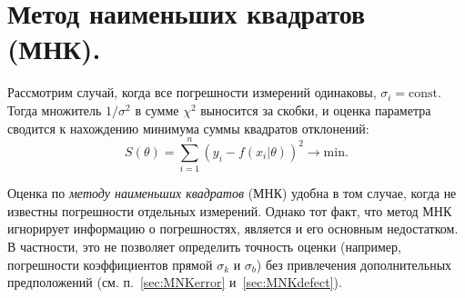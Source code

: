 \section{Метод наименьших квадратов (МНК).}

Рассмотрим случай, когда все погрешности измерений одинаковы,
$\sigma_i=\mathrm{const}$. Тогда множитель $1/\sigma^2$ в сумме $\chi^2$
выносится за скобки, и оценка параметра сводится к нахождению минимума суммы
квадратов отклонений:
\begin{equation}
S(\theta) = \sum_{i=1}^n \left(y_i - f(x_i|\theta)\right)^2 \to \mathrm{min}.
\end{equation}


Оценка по \emph{методу наименьших квадратов} (МНК) удобна в том случае,
когда не известны погрешности отдельных измерений. Однако тот  факт, что
метод МНК игнорирует информацию о погрешностях, является и его основным
недостатком. В частности, это не позволяет определить точность оценки
(например, погрешности коэффициентов прямой $\sigma_k$ и
$\sigma_b$) без привлечения дополнительных предположений
(см. п.~\ref{sec:MNKerror} и~\ref{sec:MNKdefect}).



